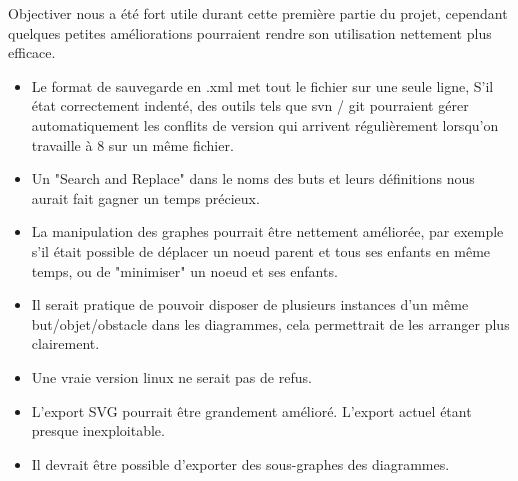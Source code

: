 Objectiver nous a été fort utile durant cette première partie du projet,
cependant quelques petites améliorations pourraient rendre son utilisation
nettement plus efficace.

\begin{itemize}
	\item Le format de sauvegarde en .xml met tout le fichier sur une seule
	ligne, S'il état correctement indenté, des outils tels que svn / git
	pourraient gérer automatiquement les conflits de version qui arrivent
	régulièrement lorsqu'on travaille à 8 sur un même fichier.
	
	\item Un "Search and Replace" dans le noms des buts et leurs définitions
	nous aurait fait gagner un temps précieux. 

	\item La manipulation des graphes pourrait être nettement améliorée,
	par exemple s'il était possible de déplacer un noeud parent et tous ses
	enfants en même temps, ou de "minimiser" un noeud et ses enfants. 

	\item Il serait pratique de pouvoir disposer de plusieurs instances d'un
	même but/objet/obstacle dans les diagrammes, cela permettrait de les 
	arranger plus clairement.

	\item Une vraie version linux ne serait pas de refus.
	
	\item L'export SVG pourrait être grandement amélioré. L'export actuel
	étant presque inexploitable.
	
	\item Il devrait être possible d'exporter des sous-graphes des diagrammes.
\end{itemize}
